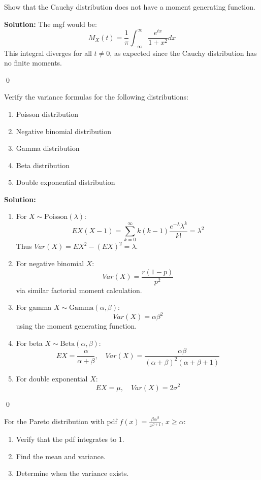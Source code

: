 \begin{problembox}
Show that the Cauchy distribution does not have a moment generating function.
\end{problembox}

\noindent\textbf{Solution:}
The mgf would be:
\[
M_X(t) = \frac{1}{\pi}\int_{-\infty}^\infty \frac{e^{tx}}{1+x^2}dx
\]
This integral diverges for all $t \neq 0$, as expected since the Cauchy distribution has no finite moments.


\qed
\begin{problembox}
Verify the variance formulas for the following distributions:
\begin{enumerate}[label=(\alph*)]
\item Poisson distribution
\item Negative binomial distribution
\item Gamma distribution
\item Beta distribution
\item Double exponential distribution
\end{enumerate}
\end{problembox}

\noindent\textbf{Solution:}
\begin{enumerate}[label=(\alph*)]
\item For $X \sim \text{Poisson}(\lambda)$:
\[
EX(X-1) = \sum_{k=0}^\infty k(k-1)\frac{e^{-\lambda}\lambda^k}{k!} = \lambda^2
\]
Thus $Var(X) = EX^2 - (EX)^2 = \lambda$.

\item For negative binomial $X$:
\[
Var(X) = \frac{r(1-p)}{p^2}
\]
via similar factorial moment calculation.

\item For gamma $X \sim \text{Gamma}(\alpha,\beta)$:
\[
Var(X) = \alpha\beta^2
\]
using the moment generating function.

\item For beta $X \sim \text{Beta}(\alpha,\beta)$:
\[
EX = \frac{\alpha}{\alpha+\beta}, \quad Var(X) = \frac{\alpha\beta}{(\alpha+\beta)^2(\alpha+\beta+1)}
\]

\item For double exponential $X$:
\[
EX = \mu, \quad Var(X) = 2\sigma^2
\]
\end{enumerate}


\qed
\begin{problembox}
For the Pareto distribution with pdf $f(x) = \frac{\beta\alpha^\beta}{x^{\beta+1}}$, $x \geq \alpha$:
\begin{enumerate}[label=(\alph*)]
\item Verify that the pdf integrates to 1.
\item Find the mean and variance.
\item Determine when the variance exists.
\end{enumerate}
\end{problembox}

